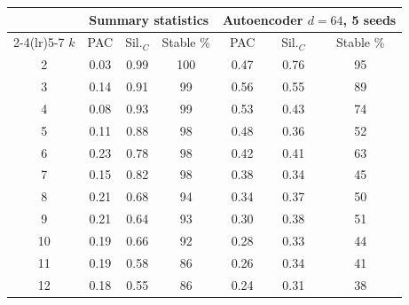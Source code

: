 \begin{tabular}{ccccccc}\toprule
 & \multicolumn{3}{c}{Summary statistics} & \multicolumn{3}{c}{Autoencoder $d=64$, 5 seeds} \\ \cmidrule(lr){2-4}\cmidrule(lr){5-7}
$k$ & PAC & Sil.$_C$ & Stable \% & PAC & Sil.$_C$ & Stable \% \\ \midrule
2 & 0.03 & 0.99 & 100 & 0.47 & 0.76 & 95 \\
3 & 0.14 & 0.91 & 99 & 0.56 & 0.55 & 89 \\
4 & 0.08 & 0.93 & 99 & 0.53 & 0.43 & 74 \\
5 & 0.11 & 0.88 & 98 & 0.48 & 0.36 & 52 \\
6 & 0.23 & 0.78 & 98 & 0.42 & 0.41 & 63 \\
7 & 0.15 & 0.82 & 98 & 0.38 & 0.34 & 45 \\
8 & 0.21 & 0.68 & 94 & 0.34 & 0.37 & 50 \\
9 & 0.21 & 0.64 & 93 & 0.30 & 0.38 & 51 \\
10 & 0.19 & 0.66 & 92 & 0.28 & 0.33 & 44 \\
11 & 0.19 & 0.58 & 86 & 0.26 & 0.34 & 41 \\
12 & 0.18 & 0.55 & 86 & 0.24 & 0.31 & 38 \\
\bottomrule\end{tabular}